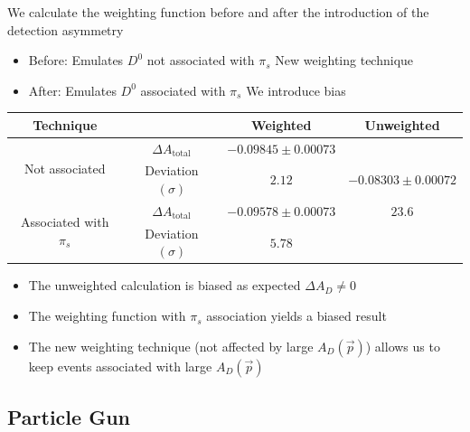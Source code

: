 \documentclass{beamer}
\begin{document}
\begin{frame}
      \frametitle{\insertsubsectionhead}
      \rightarrow We calculate the weighting function before and after the introduction of the detection asymmetry
      \begin{itemize}
            \item Before: Emulates $D^0$ not associated with $\pi_s$ \Rightarrow New weighting technique
            \item After: Emulates $D^0$ associated with $\pi_s$ \Rightarrow We introduce bias
      \end{itemize}
      \begin{center}
            \scriptsize
            \begin{tabular}{c|c|c|c}
                  Technique& & Weighted & Unweighted\\
                  \hline\hline
                  \multirow{2}{*}{Not associated} & $\Delta A_\text{total}$ & $-0.09845 \pm 0.00073$ & \\
                  & Deviation $(\sigma)$ & $2.12$ & $-0.08303 \pm 0.00072$\\
                  \cline{1-3}
                  \multirow{2}{*}{Associated with $\pi_s$} & $\Delta A_\text{total}$ & $-0.09578 \pm 0.00073$ & $23.6$\\
                  & Deviation $(\sigma)$ & $5.78$ & \\
          \end{tabular}
    \end{center}
    \normalsize
    \begin{itemize}
      \item The unweighted calculation is biased as expected \rightarrow $\Delta A_D \neq 0$
      \item The weighting function with $\pi_s$ association yields a biased result
      \item The new weighting technique (not affected by large $A_D(\vec{p})$) allows us to keep events associated with large $A_D(\vec{p})$ 
    \end{itemize}
\end{frame}

\subsection{Particle Gun}
\end{document}
